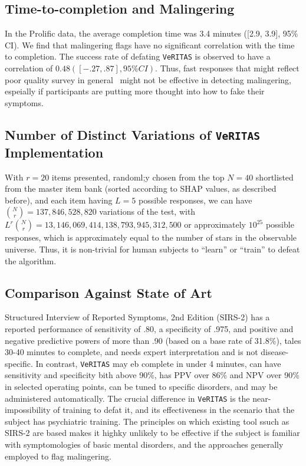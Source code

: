 \documentclass[onecolumn,10pt]{IEEEtran}
\def\vrts{\texttt{VeRITAS}\xspace}
\begin{document}
\subsection*{Time-to-completion and Malingering}
In the Prolific data, the average completion time was 3.4 minutes ([2.9, 3.9], 95\% CI). 
We find that malingering flags have no significant correlation with the time to completion. The success rate of defating \vrts is observed to have a correlation of $0.48 ([-.27, .87], 95\% CI)$. Thus, fast responses  that might reflect poor quality survey in general~\cite{tourangeau2000psychology,malhotra2008completion,callegaro2009response} might not be effective in detecting malingering, espeially if participants  are putting more thought into how to fake their symptoms.

\subsection*{Number of Distinct Variations of \vrts Implementation}
With $r=20$ items presented, randoml;y chosen from the top $N=40$ shortlisted from the master item bank (sorted according to SHAP values, as described before), and each item having  $L=5$ possible responses, we can have $\binom{N}{r}=137,846,528,820$ variations of the test, with  $L^r\binom{N}{r} = 13,146,069,414,138,793,945,312,500$ or approximately $10^{25}$ possible responses, which is approximately equal to the number of stars in the observable universe. Thus, it is non-trivial for human subjects to ``learn'' or ``train'' to defeat the algorithm.


\subsection*{Comparison Against State of Art}
Structured Interview of Reported Symptoms, 2nd Edition (SIRS-2) has a reported performance of sensitivity of .80, a specificity of .975, and positive and negative predictive powers of more than .90 (based on a base rate of 31.8\%), tales 30-40 minutes to complete, and needs expert interpretation and is not disease-specific. In contrast, \vrts may eb complete in under 4 minutes, can have sensitivity and specificity bith above 90\%, has PPV over 86\% and NPV over 90\% in selected operating points, can be tuned to specific disorders, and may be administered automatically. The crucial difference in \vrts is the near-impossibility of training to defat it, and its effectiveness in the scenario that the subject has psychiatric training. The principles on which existing tool ssuch as SIRS-2 are based makes it highky unlikely to be effective if the subject is familiar with symptomologies of basic mental disorders, and the approaches generally employed to flag malingering.
\end{document}
